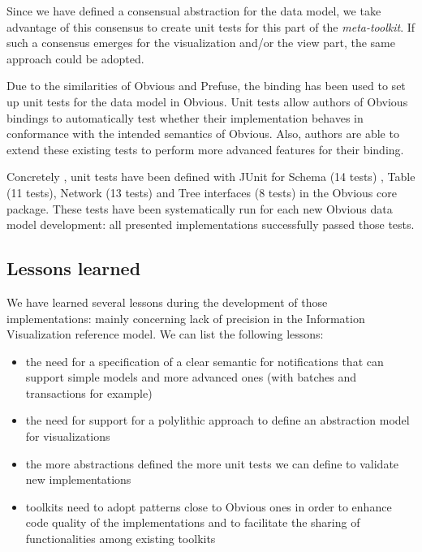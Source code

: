 Since we have defined a consensual abstraction for the data model, we take advantage of this consensus to create unit tests for this part of the \emph{meta-toolkit}. If such a consensus emerges for the visualization and/or the view part, the same approach could be adopted.

Due to the similarities of Obvious and Prefuse, the binding has been used to set up unit tests for the data model in Obvious. Unit tests allow authors of Obvious bindings to automatically test whether their implementation behaves in conformance with the intended semantics of Obvious. Also, authors are able to extend these existing tests to perform more advanced features for their binding.

Concretely , unit tests have been defined with JUnit  for Schema (14 tests) , Table (11 tests), Network (13 tests) and Tree interfaces (8 tests) in the Obvious core package. These tests have been systematically run for each new Obvious data model development: all presented implementations successfully passed those tests.

\subsection{Lessons learned}

We have learned several lessons during the development of those implementations: mainly concerning lack of precision in the Information Visualization reference model. We can list the following lessons:

\begin{itemize}
\item the need for a specification of a clear semantic for notifications that can support simple models and more advanced ones (with batches and transactions for example)
\item the need for support for a polylithic approach to define an abstraction model for visualizations
\item the more abstractions defined the more unit tests we can define to validate new implementations
\item toolkits need to adopt patterns close to Obvious ones in order to enhance code quality of the implementations and to facilitate the sharing of functionalities among existing toolkits
\end{itemize}



